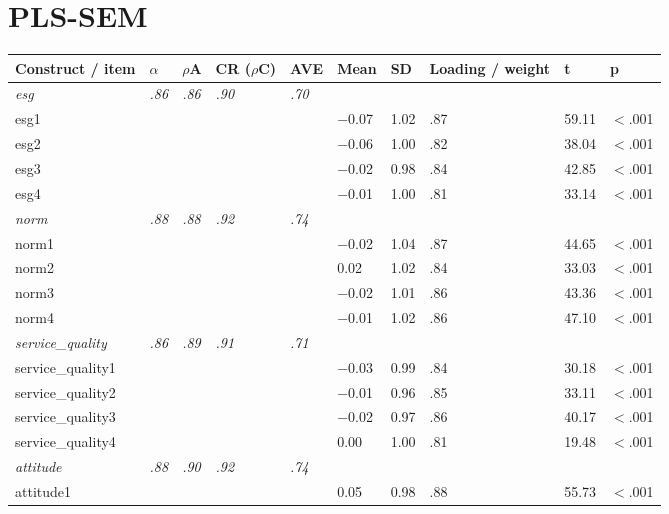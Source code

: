 \documentclass{article}
\begin{document}
\section{PLS-SEM}

\begin{tabular}{llllllllll}
\toprule
Construct / item & $\alpha$ & $\rho$A & CR ($\rho$C) & AVE & Mean & SD & Loading / weight & t & p \\
\midrule
\textit{esg} & \textit{.86} & \textit{.86} & \textit{.90} & \textit{.70} & \textit{} & \textit{} & \textit{} & \textit{} & \textit{} \\
\quad esg1 &  &  &  &  & $-$0.07 & 1.02 & .87 & 59.11 & $<$.001 \\
\quad esg2 &  &  &  &  & $-$0.06 & 1.00 & .82 & 38.04 & $<$.001 \\
\quad esg3 &  &  &  &  & $-$0.02 & 0.98 & .84 & 42.85 & $<$.001 \\
\quad esg4 &  &  &  &  & $-$0.01 & 1.00 & .81 & 33.14 & $<$.001 \\
\textit{norm} & \textit{.88} & \textit{.88} & \textit{.92} & \textit{.74} & \textit{} & \textit{} & \textit{} & \textit{} & \textit{} \\
\quad norm1 &  &  &  &  & $-$0.02 & 1.04 & .87 & 44.65 & $<$.001 \\
\quad norm2 &  &  &  &  & 0.02 & 1.02 & .84 & 33.03 & $<$.001 \\
\quad norm3 &  &  &  &  & $-$0.02 & 1.01 & .86 & 43.36 & $<$.001 \\
\quad norm4 &  &  &  &  & $-$0.01 & 1.02 & .86 & 47.10 & $<$.001 \\
\textit{service\_quality} & \textit{.86} & \textit{.89} & \textit{.91} & \textit{.71} & \textit{} & \textit{} & \textit{} & \textit{} & \textit{} \\
\quad service\_quality1 &  &  &  &  & $-$0.03 & 0.99 & .84 & 30.18 & $<$.001 \\
\quad service\_quality2 &  &  &  &  & $-$0.01 & 0.96 & .85 & 33.11 & $<$.001 \\
\quad service\_quality3 &  &  &  &  & $-$0.02 & 0.97 & .86 & 40.17 & $<$.001 \\
\quad service\_quality4 &  &  &  &  & 0.00 & 1.00 & .81 & 19.48 & $<$.001 \\
\textit{attitude} & \textit{.88} & \textit{.90} & \textit{.92} & \textit{.74} & \textit{} & \textit{} & \textit{} & \textit{} & \textit{} \\
\quad attitude1 &  &  &  &  & 0.05 & 0.98 & .88 & 55.73 & $<$.001 \\

\end{tabular}
\end{document}
